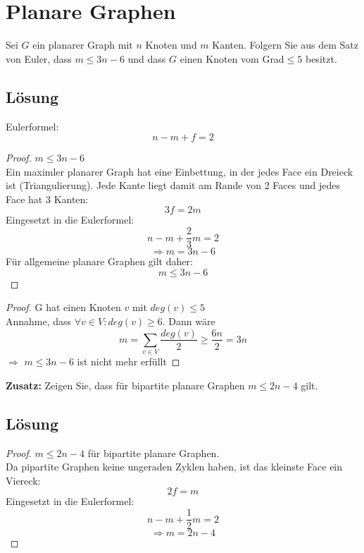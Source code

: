 \section{Planare Graphen}
	Sei $G$ ein planarer Graph mit $n$ Knoten und $m$ Kanten. Folgern Sie aus dem Satz von Euler, dass $m\leq3n-6$ und dass $G$ einen Knoten vom Grad$\leq5$ besitzt.
	
\subsection*{Lösung}
Eulerformel: 
\[ n - m + f = 2\]
\begin{proof} $m \leq 3n-6 $\\
Ein maximler planarer Graph hat eine Einbettung, in der jedes Face ein Dreieck ist (Triangulierung). Jede Kante liegt damit am Rande von 2 Faces und jedes Face hat 3 Kanten:
\[ 3f = 2m \]
Eingesetzt in die Eulerformel:
\[ n - m + \frac{2}{3}m = 2 \]
\[ \Rightarrow m = 3n-6 \]
Für allgemeine planare Graphen gilt daher:
\[ m \leq 3n-6 \]
\end{proof}

\begin{proof} G hat einen Knoten $ v $ mit $ deg(v) \leq 5 $ \\
Annahme, dass $ \forall v \in V: deg(v) \geq 6$. Dann wäre 
\[ m = \sum_{v \in V} \frac{deg(v)}{2} \geq \frac{6n}{2} = 3n \]
$ \Rightarrow $ $m \leq 3n - 6$ ist nicht mehr erfüllt
\end{proof}


\textbf{Zusatz:} Zeigen Sie, dass für bipartite planare Graphen $m\leq2n-4$ gilt.

\subsection*{Lösung}
\begin{proof} $m \leq 2n-4 $ für bipartite planare Graphen.\\
Da pipartite Graphen keine ungeraden Zyklen haben, ist das kleinste Face ein Viereck:
\[ 2f = m \]
Eingesetzt in die Eulerformel:
\[ n - m + \frac{1}{2}m = 2 \]
\[ \Rightarrow m = 2n-4 \]
\end{proof}
